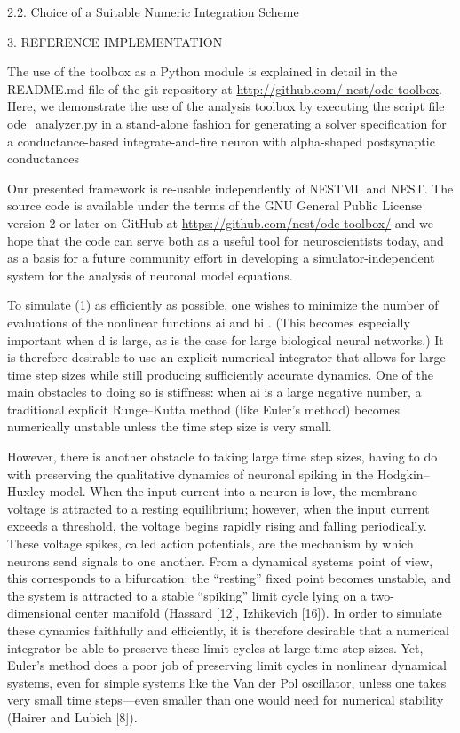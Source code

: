 2.2. Choice of a Suitable Numeric Integration Scheme

3. REFERENCE IMPLEMENTATION

The use of the toolbox as a Python module is explained in detail in the README.md file of the git repository at \url{http://github.com/ nest/ode-toolbox}. Here, we demonstrate the use of the analysis toolbox by executing the script file ode\_analyzer.py in a stand-alone fashion for generating a solver specification for a conductance-based integrate-and-fire neuron with alpha-shaped postsynaptic conductances


Our presented framework is re-usable independently of NESTML and NEST. The source code is available under the terms of the GNU General Public License version 2 or later on GitHub at \url{https://github.com/nest/ode-toolbox/} and we hope that the code can serve both as a useful tool for neuroscientists today, and as a basis for a future community effort in developing a simulator-independent system for the analysis of neuronal model equations.


To simulate (1) as efficiently as possible, one wishes to minimize the number of evaluations
of the nonlinear functions ai and bi
. (This becomes especially important when d is large,
as is the case for large biological neural networks.) It is therefore desirable to use an
explicit numerical integrator that allows for large time step sizes while still producing
sufficiently accurate dynamics. One of the main obstacles to doing so is stiffness: when ai
is
a large negative number, a traditional explicit Runge–Kutta method (like Euler’s method)
becomes numerically unstable unless the time step size is very small. 


However, there is another obstacle to taking large time step sizes, having to do with
preserving the qualitative dynamics of neuronal spiking in the Hodgkin–Huxley model.
When the input current into a neuron is low, the membrane voltage is attracted to a
resting equilibrium; however, when the input current exceeds a threshold, the voltage begins
rapidly rising and falling periodically. These voltage spikes, called action potentials, are the
mechanism by which neurons send signals to one another. From a dynamical systems point
of view, this corresponds to a bifurcation: the “resting” fixed point becomes unstable, and
the system is attracted to a stable “spiking” limit cycle lying on a two-dimensional center
manifold (Hassard [12], Izhikevich [16]). In order to simulate these dynamics faithfully and
efficiently, it is therefore desirable that a numerical integrator be able to preserve these limit
cycles at large time step sizes. Yet, Euler’s method does a poor job of preserving limit cycles
in nonlinear dynamical systems, even for simple systems like the Van der Pol oscillator,
unless one takes very small time steps—even smaller than one would need for numerical
stability (Hairer and Lubich [8]).


